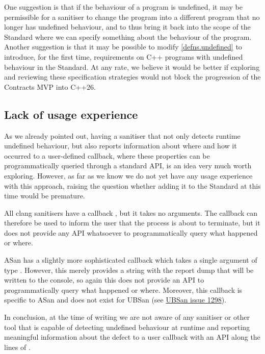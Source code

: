 One suggestion is that if the behaviour of a program is undefined, it may be permissible for a sanitiser to change the program into a different program that no longer has undefined behaviour, and to thus bring it back into the scope of the Standard where we can specify something about the behaviour of the program. Another suggestion is that it may be possible to modify \href{https://eel.is/c++draft/defns.undefined}{[defns.undefined]} to introduce, for the first time, requirements on C++ programs with undefined behaviour in the Standard. At any rate, we believe it would be better if exploring and reviewing these specification strategies would not block the progression of the Contracts MVP into C++26.

\subsection{Lack of usage experience}

As we already pointed out, having a sanitiser that not only detects runtime undefined behaviour, but also reports information about where and how it occurred to a user-defined callback, where these properties can be programmatically queried through a standard API, is an idea very much worth exploring. However, as far as we know we do not yet have any usage experience with this approach, raising the question whether adding it to the Standard at this time would be premature.

All clang sanitisers have a callback , but it takes no arguments. The callback can therefore be used to inform the user that the process is about to terminate, but it does not provide any API whatsoever to programmatically query what happened or where.

ASan has a slightly more sophisticated callback  which takes a single argument of type . However, this merely provides a string with the report dump that will be written to the console, so again this does not provide an API to programmatically query what happened or where. Moreover, this callback is specific to ASan and does not exist for UBSan (see \href{ https://github.com/google/sanitizers/issues/1298}{UBSan issue 1298}).

In conclusion, at the time of writing we are not aware of any sanitiser or other tool that is capable of detecting undefined behaviour at runtime and reporting meaningful information about the defect to a user callback with an API along the lines of \mbox{}.

